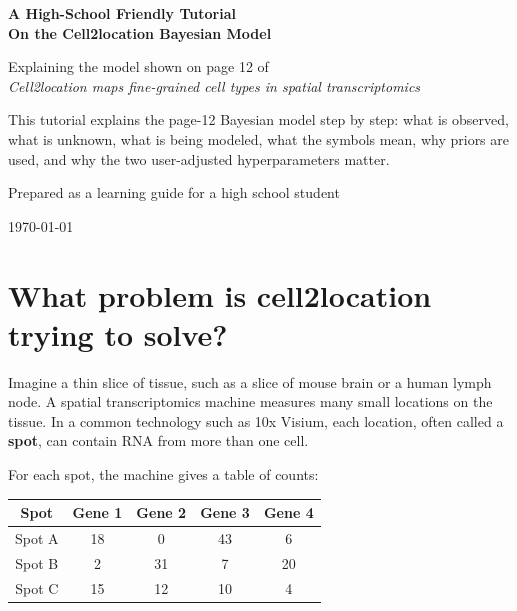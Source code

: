 \documentclass[11pt]{article}
\newcommand{\term}[1]{\textbf{#1}}
\begin{document}
\begin{titlepage}
\centering
\vspace*{0.5in}
{\Huge\bfseries A High-School Friendly Tutorial\\[0.3em]
On the Cell2location Bayesian Model\par}
\vspace{0.35in}
{\Large Explaining the model shown on page 12 of\\
\emph{Cell2location maps fine-grained cell types in spatial transcriptomics}\par}
\vspace{0.55in}
\begin{tcolorbox}[colback=softblue,colframe=deepblue,width=0.88\textwidth,arc=2mm]
\large
This tutorial explains the page-12 Bayesian model step by step: what is observed, what is unknown, what is being modeled, what the symbols mean, why priors are used, and why the two user-adjusted hyperparameters matter.
\end{tcolorbox}
\vfill
{\large Prepared as a learning guide for a high school student}\par
\vspace{0.3in}
{\large \today}\par
\end{titlepage}

\tableofcontents
\newpage

\section{What problem is cell2location trying to solve?}

Imagine a thin slice of tissue, such as a slice of mouse brain or a human lymph node. A spatial transcriptomics machine measures many small locations on the tissue. In a common technology such as 10x Visium, each location, often called a \term{spot}, can contain RNA from more than one cell.

For each spot, the machine gives a table of counts:

\begin{center}
\begin{tabular}{c|cccc}
\toprule
Spot & Gene 1 & Gene 2 & Gene 3 & Gene 4 \\
\midrule
Spot A & 18 & 0 & 43 & 6 \\
Spot B & 2 & 31 & 7 & 20 \\
Spot C & 15 & 12 & 10 & 4 \\
\bottomrule
\end{tabular}
\end{center}
\end{document}
